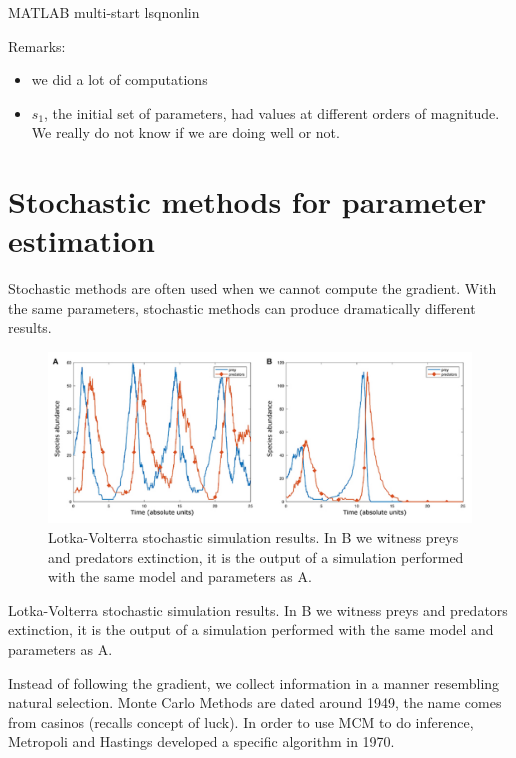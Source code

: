MATLAB multi-start lsqnonlin

Remarks:

\begin{itemize}
\tightlist
\item
  we did a lot of computations
\item
  $s_1$, the initial set of parameters, had values at different orders
  of magnitude. We really do not know if we are doing well or not.
\end{itemize}

\hypertarget{stochastic-methods-for-parameter-estimation}{%
\section{Stochastic methods for parameter
estimation}\label{stochastic-methods-for-parameter-estimation}}

Stochastic methods are often used when we cannot compute the gradient.
With the same parameters, stochastic methods can produce dramatically
different results.

\begin{figure}
\centering
\includegraphics[width=\textwidth]{stoch_LV.png}
\caption{Lotka-Volterra stochastic simulation results. In B we witness
preys and predators extinction, it is the output of a simulation
performed with the same model and parameters as A.}
\end{figure}

Lotka-Volterra stochastic simulation results. In B we witness preys and
predators extinction, it is the output of a simulation performed with
the same model and parameters as A.

Instead of following the gradient, we collect information in a manner
resembling natural selection. Monte Carlo Methods are dated around 1949,
the name comes from casinos (recalls concept of luck). In order to use
MCM to do inference, Metropoli and Hastings developed a specific
algorithm in 1970.

